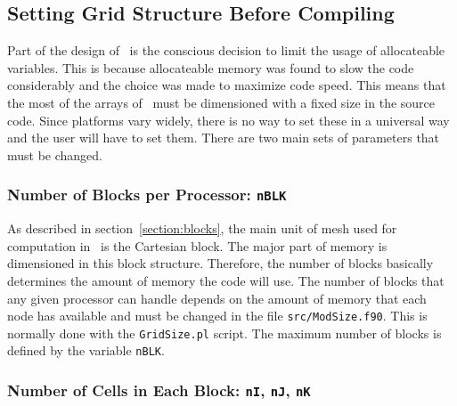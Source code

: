 \subsection{Setting Grid Structure Before Compiling \BATSRUS\ \label{section:before_compile}}

Part of the design of \BATSRUS\ is the conscious decision to limit the
usage of allocateable variables.  This is because
allocateable memory was found to slow the code considerably and 
the choice was made to maximize code speed.  This means that the
most of the arrays of \BATSRUS\ must be dimensioned with a fixed size
in the source code. 
Since platforms vary widely, there is no way to set these in a universal
way and the user will have to set them.  There are two main sets of 
parameters that must be changed.

\subsubsection{Number of Blocks per Processor: {\tt nBLK} \label{section:nblk}}

As described in section~\ref{section:blocks}, 
the main unit of mesh used for computation in \BATSRUS\ 
is the Cartesian block.  The major part of memory is dimensioned in this
block structure.  Therefore, the number of blocks basically determines the
amount of memory the code will use.  The number
of blocks that any given processor can handle depends on the amount of
memory that each node has available and must be changed in the file 
{\tt src/ModSize.f90}. This is normally done with the {\tt GridSize.pl}
script.
The maximum number of blocks is defined by the variable {\tt nBLK}.  

\subsubsection{Number of Cells in Each Block: {\tt nI},
{\tt nJ}, {\tt nK} \label{section:ncells}}

